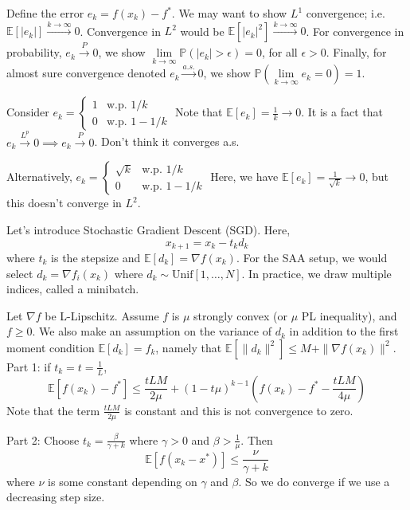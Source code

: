 \documentclass[english, 11pt]{article}
\begin{document}
 Define the error $e_k = f(x_k)  - f^*$. We may want to show $L^1$ convergence; i.e. $\mathbb{E}[|e_k|] \xrightarrow{k \to \infty} 0$. Convergence in $L^2$ would be $\mathbb{E}[ |e_k|^2 ] \xrightarrow{k \to \infty} 0$. For convergence in probability, $e_k \xrightarrow{P} 0$, we show $\lim \limits_{k \to \infty} \mathbb{P}(|e_k| > \epsilon) =0$, for all $\epsilon>0$. Finally, for almost sure convergence denoted $e_k \xrightarrow{a.s.} 0$, we show $\mathbb{P}( \lim \limits_{k \to \infty} e_k =0 ) = 1$.


\begin{exmp}
Consider $e_k = \begin{cases} 1 & \text{w.p. } 1/k \\
0 & \text{w.p. } 1- 1/k 
\end{cases}$
Note that $\mathbb{E}[e_k] = \frac{1}{k} \to 0$. It is a fact that $e_k \xrightarrow{L^p} 0 \implies e_k \xrightarrow{P} 0$. Don't think it converges a.s.

Alternatively, $e_k = \begin{cases} \sqrt{k} & \text{w.p. } 1/k \\
0 & \text{w.p. } 1- 1/k 
\end{cases}$
Here, we have $\mathbb{E}[e_k] = \frac{1}{\sqrt{k}} \to 0$, but this doesn't converge in $L^2$.
\end{exmp}


Let's introduce Stochastic Gradient Descent (SGD). Here,
\[
x_{k+1} = x_k - t_k d_k
\]
where $t_k$ is the stepsize and $\mathbb{E}[d_k] = \nabla f(x_k)$. For the SAA setup, we would select $d_k = \nabla f_i(x_k)$ where $d_k \sim \text{Unif}[1,\dots,N]$. In practice, we draw multiple indices, called a minibatch.

\begin{thrm}
Let $\nabla f$ be L-Lipschitz. Assume $f$ is $\mu$ strongly convex (or $\mu$ PL inequality), and $f \ge 0$. We also make an assumption on the variance of $d_k$ in addition to the first moment condition $\mathbb{E}[d_k ]= f_k$, namely that $\mathbb{E}[ \|d_k\|^2 ] \le M + \| \nabla f(x_k)\|^2$. Part 1: if $t_k = t = \frac{1}{L}$, 
\[
\mathbb{E}[ f(x_k) - f^*] \le \frac{t L M}{2 \mu} + \left( 1 - t \mu \right)^{k-1} \left( f(x_k) - f^* - \frac{tLM}{4 \mu} \right)
\]
Note that the term $\frac{tLM}{2\mu}$ is constant and this is not convergence to zero.

Part 2: Choose $t_k = \frac{\beta}{\gamma+k}$ where $\gamma>0$ and $\beta> \frac{1}{\mu}$. Then
\[
\mathbb{E}[ f(x_k - x^*) ] \le \frac{\nu}{\gamma+k}
\]
 where $\nu$ is some constant depending on $\gamma$ and $\beta$. So we do converge if we use a decreasing step size.
\end{thrm}
\end{document}
